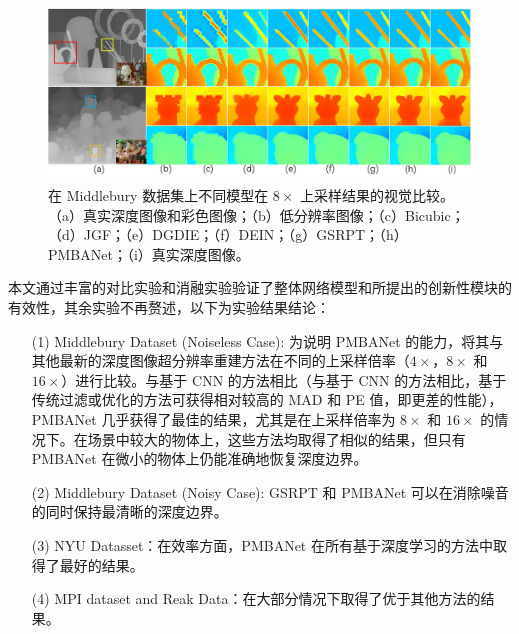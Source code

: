 \documentclass{vip-theme}
\begin{document}
\begin{figure}[!htbp]
\centering
	\includegraphics[width=.7\paperwidth]{figure/experiments1.png}
	\caption{在 Middlebury 数据集上不同模型在 $8\times$ 上采样结果的视觉比较。（a）真实深度图像和彩色图像；（b）低分辨率图像；（c）Bicubic；（d）JGF；（e）DGDIE；（f）DEIN；（g）GSRPT；（h）PMBANet；（i）真实深度图像。}
	\label{fig:experiment}
\end{figure}

本文通过丰富的对比实验和消融实验验证了整体网络模型和所提出的创新性模块的有效性，其余实验不再赘述，以下为实验结果结论：

\begin{enumerate}
	\item[(1)] Middlebury Dataset (Noiseless Case): 为说明 PMBANet 的能力，将其与其他最新的深度图像超分辨率重建方法在不同的上采样倍率（$4\times$，$8\times$ 和 $16\times$）进行比较。与基于 CNN 的方法相比（与基于 CNN 的方法相比，基于传统过滤或优化的方法可获得相对较高的 MAD 和 PE 值，即更差的性能），PMBANet 几乎获得了最佳的结果，尤其是在上采样倍率为 $8\times$ 和 $16\times$ 的情况下。在场景中较大的物体上，这些方法均取得了相似的结果，但只有 PMBANet 在微小的物体上仍能准确地恢复深度边界。
	\item[(2)] Middlebury Dataset (Noisy Case): GSRPT 和 PMBANet 可以在消除噪音的同时保持最清晰的深度边界。
	\item[(3)] 	NYU Datasset：在效率方面，PMBANet 在所有基于深度学习的方法中取得了最好的结果。
	\item[(4)] 	MPI dataset and Reak Data：在大部分情况下取得了优于其他方法的结果。
 
\end{enumerate}



%
\end{document}
